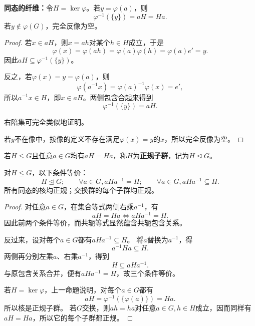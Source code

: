 \begin{proposition}
\textbf{同态的纤维：}令$H=\ker\varphi$。若$y=\varphi(a)$，则
\[
\varphi^{-1}(\{y\})=aH=Ha.
\]
若$y\notin\varphi(G)$，完全反像为空。
\end{proposition}
\begin{proof}
若$x\in aH$，则$x=ah$对某个$h\in H$成立，于是
\[
\varphi(x)=\varphi(ah)=\varphi(a)\varphi(h)=\varphi(a)e'=y.
\]
因此$aH\subseteq\varphi^{-1}(\{y\})$。

反之，若$\varphi(x)=y=\varphi(a)$，则
\[
\varphi(a^{-1}x)=\varphi(a)^{-1}\varphi(x)=e',
\]
所以$a^{-1}x\in H$，即$x\in aH$。两侧包含合起来得到
\[
\varphi^{-1}(\{y\})=aH.
\]

右陪集可完全类似地证明。

若$y$不在像中，按像的定义不存在满足$\varphi(x)=y$的$x$，所以完全反像为空。
\end{proof}

\begin{definition}
\label{p2:concept:c1-l574}若$H\leq G$且任意$a\in G$均有$aH=Ha$，称$H$为\textbf{正规子群}，记为$H\trianglelefteq G$。
\end{definition}

\begin{proposition}
对$H\leq G$，以下条件等价：
\[
H\trianglelefteq G;\qquad
\forall a\in G, aHa^{-1}=H;\qquad
\forall a\in G, aHa^{-1}\subseteq H.
\]
所有同态的核均正规；交换群的每个子群均正规。
\end{proposition}
\begin{proof}
对任意$a\in G$，在集合等式两侧右乘$a^{-1}$，有
\[
aH=Ha\iff aHa^{-1}=H.
\]
因此前两个条件等价，而共轭等式显然蕴含共轭包含关系。

反过来，设对每个$a\in G$都有$aHa^{-1}\subseteq H$。
将$a$替换为$a^{-1}$，得
\[
a^{-1}Ha\subseteq H.
\]
两侧再分别左乘$a$、右乘$a^{-1}$，得到
\[
H\subseteq aHa^{-1}.
\]
与原包含关系合并，便有$aHa^{-1}=H$，故三个条件等价。

若$H=\ker\varphi$，上一命题说明，对每个$a\in G$都有
\[
aH=\varphi^{-1}(\{\varphi(a)\})=Ha.
\]
所以核是正规子群。
若$G$交换，则$ah=ha$对任意$a\in G,h\in H$成立，因而同样有$aH=Ha$，所以它的每个子群都正规。
\end{proof}
